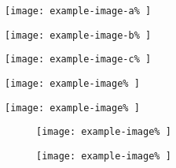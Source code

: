 \documentclass{article}
\let\vamaxheight\relax
\newlength{\vamaxheight%
	}
\begin{document}
\begin{verticallyaligned}
	\noindent
	\begin{minipage}[b][\vamaxheight][b]{.30\textwidth%
		}
		\centering
		\texttt{[image: example-image-a\%
		]}
	\end{minipage}
	\hfill
	\begin{minipage}[b][\vamaxheight][t]{.10\textwidth%
		}
		\centering
		\texttt{[image: example-image-b\%
		]}
	\end{minipage}
	\hfill
	\begin{minipage}[b][\vamaxheight][t]{.20\textwidth%
		}
		\centering
		\texttt{[image: example-image-c\%
		]}
	\end{minipage}
	\hfill
	\begin{minipage}[b][\vamaxheight][c]{.20\textwidth%
		}
		\centering
		\texttt{[image: example-image\%
		]}
	\end{minipage}
	\hfill
	\begin{minipage}[b][\vamaxheight][t]{.20\textwidth%
		}
		\centering
		\texttt{[image: example-image\%
		]}
	\end{minipage}
\end{verticallyaligned}

\lipsum[1]

\begin{figure}
	\begin{verticallyaligned}
		\noindent
		\begin{minipage}[b][\vamaxheight][c]{.50\textwidth%
			}
			\centering
			\texttt{[image: example-image\%
			]}
			\caption{%
			}
		\end{minipage}
		\hfill
		\begin{minipage}[b][\vamaxheight][t]{.40\textwidth%
			}
			\centering
			\texttt{[image: example-image\%
			]}
			\caption{%
			}
		\end{minipage}
	\end{verticallyaligned}
	\caption{%
	}
\end{figure}
\end{document}
